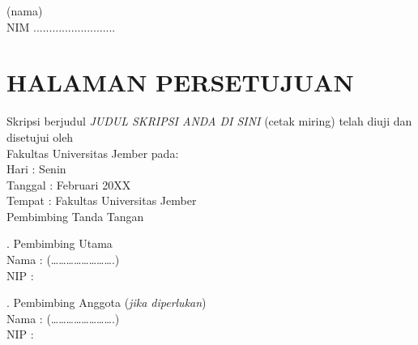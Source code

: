 \documentclass[12pt, a4paper, onecolumn, oneside]{report}
\newcommand{\thetitle}{JUDUL SKRIPSI ANDA DI SINI} %
\begin{document}
\vspace{1cm} %
\raggedleft (nama) \\
\raggedleft NIM ..........................
\raggedright
\clearpage
\cleardoublepage
\chapter*{HALAMAN PERSETUJUAN}

\noindent Skripsi berjudul \textit{\thetitle} (cetak miring) telah diuji dan disetujui oleh \\
\noindent Fakultas \underline{\hspace{4cm}} Universitas Jember pada: \\
\noindent Hari \quad\quad\quad: Senin \\
\noindent Tanggal \quad\quad: \underline{\hspace{0.8cm}} Februari 20XX \\
\noindent Tempat \quad\quad: Fakultas \underline{\hspace{4cm}} Universitas Jember \\

\vspace{0.5cm}
\noindent Pembimbing \hfill Tanda Tangan \\

\vspace{0.5cm} %

. Pembimbing Utama \\
Nama \quad: \underline{\hspace{5cm}} \hfill (…………………….) \\
NIP \quad\quad: \underline{\hspace{5cm}} \\

\vspace{0.5cm} %

. Pembimbing Anggota (\textit{jika diperlukan}) \\
Nama \quad: \underline{\hspace{5cm}} \hfill (…………………….) \\
NIP \quad\quad: \underline{\hspace{5cm}} \\

\vspace{1cm} %
\end{document}
